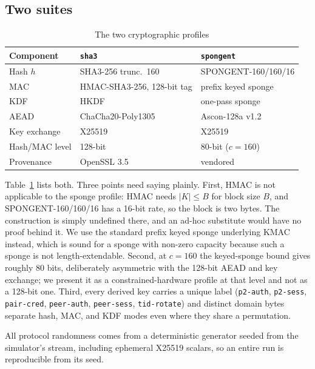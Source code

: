 \documentclass[conference]{IEEEtran}
\begin{document}
\subsection{Two suites}

\begin{table}[H]
\centering
\caption{The two cryptographic profiles}
\label{tab:suites}
\footnotesize
\setlength{\tabcolsep}{3.5pt}
\begin{tabular}{@{}lll@{}}
\toprule
\textbf{Component} & \textbf{\texttt{sha3}} & \textbf{\texttt{spongent}} \\
\midrule
Hash $h$        & SHA3-256 trunc.\ 160 & SPONGENT-160/160/16 \\
MAC             & HMAC-SHA3-256, 128-bit tag & prefix keyed sponge \\
KDF             & HKDF & one-pass sponge \\
AEAD            & ChaCha20-Poly1305 & Ascon-128a v1.2 \\
Key exchange    & X25519 & X25519 \\
Hash/MAC level  & 128-bit & 80-bit ($c=160$) \\
Provenance      & OpenSSL 3.5 & vendored \\
\bottomrule
\end{tabular}
\end{table}

Table~\ref{tab:suites} lists both. Three points need saying plainly. First,
HMAC is not applicable to the sponge profile: HMAC needs $|K| \le B$ for block
size $B$, and SPONGENT-160/160/16 has a 16-bit rate, so the block is two bytes.
The construction is simply undefined there, and an ad-hoc substitute would have
no proof behind it. We use the standard prefix keyed sponge underlying
KMAC~\cite{sha3_standard} instead, which is sound for a sponge with non-zero
capacity because such a sponge is not length-extendable. Second, at $c=160$ the
keyed-sponge bound gives roughly 80 bits, deliberately asymmetric with the
128-bit AEAD and key exchange; we present it as a constrained-hardware profile
at that level and not as a 128-bit one. Third, every derived key carries a
unique label (\texttt{p2-auth}, \texttt{p2-sess}, \texttt{pair-cred},
\texttt{peer-auth}, \texttt{peer-sess}, \texttt{tid-rotate}) and distinct domain
bytes separate hash, MAC, and KDF modes even where they share a permutation.

All protocol randomness comes from a deterministic generator seeded from the
simulator's stream, including ephemeral X25519 scalars, so an entire run is
reproducible from its seed.
\end{document}
